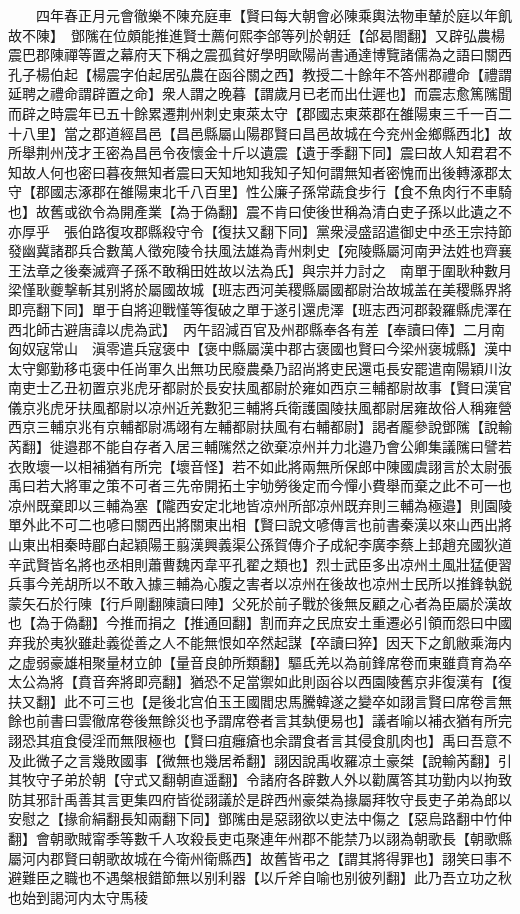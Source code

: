 　　四年春正月元會徹樂不陳充庭車【賢曰每大朝會必陳乘輿法物車輦於庭以年飢故不陳】　鄧隲在位頗能推進賢士薦何熙李郃等列於朝廷【郃曷閤翻】又辟弘農楊震巴郡陳禪等置之幕府天下稱之震孤貧好學明歐陽尚書通達博覽諸儒為之語曰關西孔子楊伯起【楊震字伯起居弘農在函谷關之西】教授二十餘年不答州郡禮命【禮謂延聘之禮命謂辟置之命】衆人謂之晚暮【謂歲月已老而出仕遲也】而震志愈篤隲聞而辟之時震年已五十餘累遷荆州刺史東萊太守【郡國志東萊郡在雒陽東三千一百二十八里】當之郡道經昌邑【昌邑縣屬山陽郡賢曰昌邑故城在今兖州金鄉縣西北】故所舉荆州茂才王密為昌邑令夜懷金十斤以遺震【遺于季翻下同】震曰故人知君君不知故人何也密曰暮夜無知者震曰天知地知我知子知何謂無知者密愧而出後轉涿郡太守【郡國志涿郡在雒陽東北千八百里】性公廉子孫常蔬食步行【食不魚肉行不車騎也】故舊或欲令為開產業【為于偽翻】震不肯曰使後世稱為清白吏子孫以此遺之不亦厚乎　張伯路復攻郡縣殺守令【復扶又翻下同】黨衆浸盛詔遣御史中丞王宗持節發幽冀諸郡兵合數萬人徵宛陵令扶風法雄為青州刺史【宛陵縣屬河南尹法姓也齊襄王法章之後秦滅齊子孫不敢稱田姓故以法為氏】與宗并力討之　南單于圍耿种數月梁慬耿夔撃斬其别將於屬國故城【班志西河美稷縣屬國都尉治故城盖在美稷縣界將即亮翻下同】單于自將迎戰慬等復破之單于遂引還虎澤【班志西河郡穀羅縣虎澤在西北師古避唐諱以虎為武】　丙午詔減百官及州郡縣奉各有差【奉讀曰俸】二月南匈奴寇常山　滇零遣兵寇褒中【褒中縣屬漢中郡古褒國也賢曰今梁州褒城縣】漢中太守鄭勤移屯褒中任尚軍久出無功民廢農桑乃詔尚將吏民還屯長安罷遣南陽穎川汝南吏士乙丑初置京兆虎牙都尉於長安扶風都尉於雍如西京三輔都尉故事【賢曰漢官儀京兆虎牙扶風都尉以凉州近羌數犯三輔將兵衛護園陵扶風都尉居雍故俗人稱雍營西京三輔京兆有京輔都尉馮翊有左輔都尉扶風有右輔都尉】謁者龎參說鄧隲【說輸芮翻】徙邉郡不能自存者入居三輔隲然之欲棄凉州并力北邉乃會公卿集議隲曰譬若衣敗壞一以相補猶有所完【壞音怪】若不如此將兩無所保郎中陳國虞詡言於太尉張禹曰若大將軍之策不可者三先帝開拓土宇劬勞後定而今憚小費舉而棄之此不可一也凉州既棄即以三輔為塞【隴西安定北地皆凉州所部凉州既弃則三輔為極邉】則園陵單外此不可二也喭曰關西出將關東出相【賢曰說文喭傳言也前書秦漢以來山西出將山東出相秦時郿白起穎陽王翦漢興義渠公孫賀傳介子成紀李廣李蔡上邽趙充國狄道辛武賢皆名將也丞相則蕭曹魏丙韋平孔翟之類也】烈士武臣多出凉州土風壯猛便習兵事今羌胡所以不敢入據三輔為心腹之害者以凉州在後故也凉州士民所以推鋒執鋭蒙矢石於行陳【行戶剛翻陳讀曰陣】父死於前子戰於後無反顧之心者為臣屬於漢故也【為于偽翻】今推而捐之【推通回翻】割而弃之民庶安土重遷必引領而怨曰中國弃我於夷狄雖赴義從善之人不能無恨如卒然起謀【卒讀曰猝】因天下之飢敝乘海内之虚弱豪雄相聚量材立帥【量音良帥所類翻】驅氐羌以為前鋒席卷而東雖賁育為卒太公為將【賁音奔將即亮翻】猶恐不足當禦如此則函谷以西園陵舊京非復漢有【復扶又翻】此不可三也【是後北宫伯玉王國閻忠馬騰韓遂之變卒如詡言賢曰席卷言無餘也前書曰雲徹席卷後無餘災也予謂席卷者言其埶便易也】議者喻以補衣猶有所完詡恐其疽食侵淫而無限極也【賢曰疽癰瘡也余謂食者言其侵食肌肉也】禹曰吾意不及此微子之言幾敗國事【微無也幾居希翻】詡因說禹收羅凉土豪桀【說輸芮翻】引其牧守子弟於朝【守式又翻朝直遥翻】令諸府各辟數人外以勸厲答其功勤内以拘致防其邪計禹善其言更集四府皆從詡議於是辟西州豪桀為掾屬拜牧守長吏子弟為郎以安慰之【掾俞絹翻長知兩翻下同】鄧隲由是惡詡欲以吏法中傷之【惡烏路翻中竹仲翻】會朝歌賊甯季等數千人攻殺長吏屯聚連年州郡不能禁乃以詡為朝歌長【朝歌縣屬河内郡賢曰朝歌故城在今衛州衛縣西】故舊皆弔之【謂其將得罪也】詡笑曰事不避難臣之職也不遇槃根錯節無以别利器【以斤斧自喻也别彼列翻】此乃吾立功之秋也始到謁河内太守馬稜